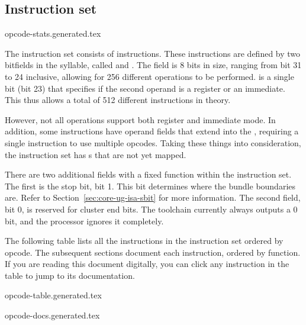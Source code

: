 \subsection{Instruction set}
\label{sec:core-ug-isa-insn-set}

{opcode-stats.generated.tex}

The \rvex{} instruction set consists of \instructioncount{} instructions. These
instructions are defined by two bitfields in the syllable, called 
and . The  field is 8 bits in size, ranging from bit
31 to 24 inclusive, allowing for 256 different operations to be performed.
 is a single bit (bit 23) that specifies if the second operand is a
register or an immediate. This thus allows a total of 512 different
instructions in theory.

However, not all operations support both register and immediate mode. In
addition, some instructions have operand fields that extend into the
, requiring a single instruction to use multiple opcodes. Taking
these things into consideration, the \rvex{} instruction set has
\freeopcodecount{} s that are not yet mapped.

There are two additional fields with a fixed function within the instruction
set. The first is the stop bit, bit 1. This bit determines where the bundle
boundaries are. Refer to Section~\ref{sec:core-ug-isa-sbit} for more
information. The second field, bit 0, is reserved for cluster end bits. The
toolchain currently always outputs a 0 bit, and the processor ignores it
completely.

The following table lists all the instructions in the \rvex{} instruction set
ordered by opcode. The subsequent sections document each instruction, ordered by
function. If you are reading this document digitally, you can click any
instruction in the table to jump to its documentation.

{opcode-table.generated.tex}

\newcommand{\insndocsection}[1]{\subsubsection{#1}}
{opcode-docs.generated.tex}

